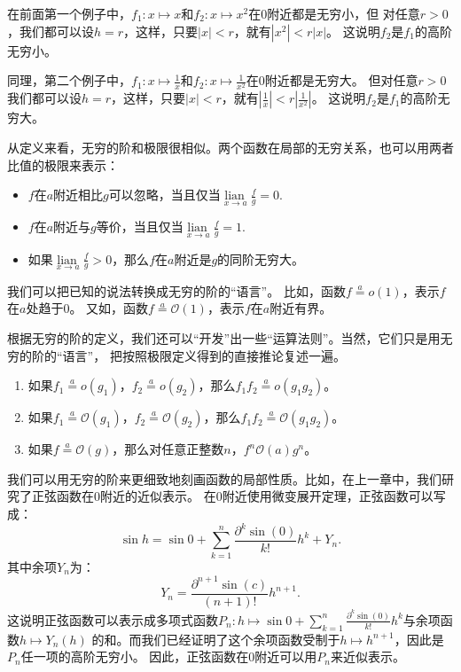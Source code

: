 \documentclass[12pt,UTF8]{ctexbook}
\newcommand{\lian}[1]{
    \underset{#1}{\operatorname{lian}\,}
}
\newcommand{\oveq}[1]{\overset{#1}{=}}
\newcommand{\olim}[1]{\mathit{o}\left(#1\right)}  %
\newcommand{\Olim}[1]{\mathcal{O}\left(#1\right)}  %
\begin{document}
在前面第一个例子中，$f_1: x\mapsto x$和$f_2: x\mapsto x^2$在$0$附近都是无穷小，但
对任意$r > 0$，我们都可以设$h = r$，这样，只要$|x| < r$，就有$|x^2| < r|x|$。
这说明$f_2$是$f_1$的高阶无穷小。

同理，第二个例子中，$f_1: x\mapsto \frac{1}{x}$和$f_2: x\mapsto \frac{1}{x^2}$在$0$附近都是无穷大。
但对任意$r > 0$我们都可以设$h = r$，这样，只要$|x| < r$，就有$|\frac{1}{x}| < r|\frac{1}{x^2}|$。
这说明$f_2$是$f_1$的高阶无穷大。

从定义来看，无穷的阶和极限很相似。两个函数在局部的无穷关系，也可以用两者比值的极限来表示：
\begin{itemize}
    \item $f$在$a$附近相比$g$可以忽略，当且仅当$\lian{x\to a} \frac{f}{g} = 0.$
    \item $f$在$a$附近与$g$等价，当且仅当$\lian{x\to a} \frac{f}{g} = 1.$
    \item 如果$\lian{x\to a} \frac{f}{g} > 0$，那么$f$在$a$附近是$g$的同阶无穷大。
\end{itemize}

我们可以把已知的说法转换成无穷的阶的“语言”。
比如，函数$f \oveq{a} \olim{1}$，表示$f$在$a$处趋于$0$。
又如，函数$f \oveq{a} \Olim{1}$，表示$f$在$a$附近有界。

根据无穷的阶的定义，我们还可以“开发”出一些“运算法则”。当然，它们只是用无穷的阶的“语言”，
把按照极限定义得到的直接推论复述一遍。
\begin{enumerate}
    \item 如果$f_1 \oveq{a} \olim{g_1}$，$f_2 \oveq{a} \olim{g_2}$，那么$f_1 f_2 \oveq{a} \olim{g_1 g_2}$。
    \item 如果$f_1 \oveq{a} \Olim{g_1}$，$f_2 \oveq{a} \Olim{g_2}$，那么$f_1 f_2 \oveq{a} \Olim{g_1 g_2}$。
    \item 如果$f \oveq{a} \Olim{g}$，那么对任意正整数$n$，$f^n \Olim{a}{g^n}$。
\end{enumerate}

我们可以用无穷的阶来更细致地刻画函数的局部性质。比如，在上一章中，我们研究了正弦函数在$0$附近的近似表示。
在$0$附近使用微变展开定理，正弦函数可以写成：
$$ \sin{h} = \sin{0} + \sum_{k=1}^n \frac{\partial^k \sin (0)}{k!}h^k + Y_n. $$
其中余项$Y_n$为：
$$ Y_n = \frac{\partial^{n+1} \sin (c)}{(n+1)!}h^{n+1}. $$
这说明正弦函数可以表示成多项式函数$P_n :h \mapsto \sin{0} + \sum_{k=1}^n \frac{\partial^k \sin (0)}{k!}h^k$与余项函数$h\mapsto Y_n(h)$
的和。而我们已经证明了这个余项函数受制于$h\mapsto h^{n+1}$，因此是$P_n$任一项的高阶无穷小。
因此，正弦函数在$0$附近可以用$P_n$来近似表示。
\end{document}
